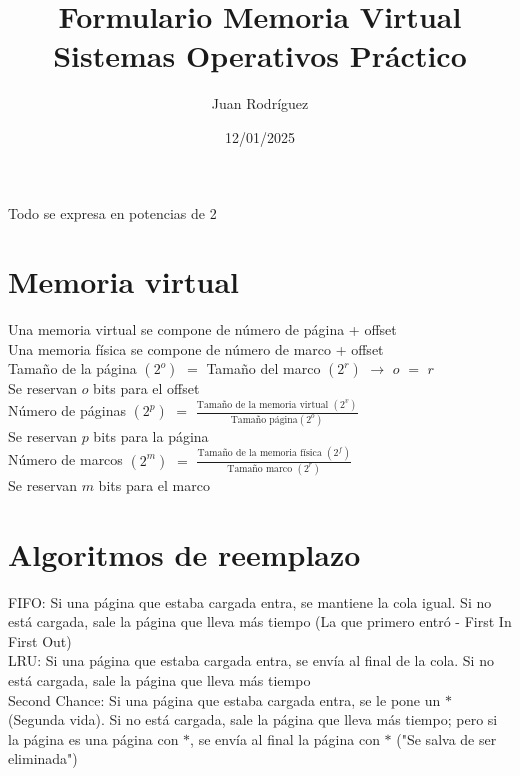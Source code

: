 \documentclass[fleqn]{article}
\author{Juan Rodríguez}
\title{Formulario Memoria Virtual Sistemas Operativos Práctico}
\date{12/01/2025}
\begin{document}
	\maketitle
	Todo se expresa en potencias de 2
	\section{Memoria virtual}
	Una memoria virtual se compone de número de página + offset \\
	
	Una memoria física se compone de número de marco + offset \\
	
	Tamaño de la página $(2^{o})$ $=$ Tamaño del marco $(2^{r})$ $\rightarrow$ $o$ $=$ $r$ \\
	
	Se reservan $o$ bits para el offset \\
	
	Número de páginas $(2^{p})$ $=$ $\frac{\text{Tamaño de la memoria virtual $(2^v)$}}{\text{Tamaño página$(2^{o})$}}$ \\
	
	Se reservan $p$ bits para la página \\
	
	Número de marcos $(2^{m})$ $=$ $\frac{\text{Tamaño de la memoria física $(2^f)$}}{\text{Tamaño marco $(2^{r})$}}$ \\
	
	Se reservan $m$ bits para el marco
	\section{Algoritmos de reemplazo}
	FIFO: Si una página que estaba cargada entra, se mantiene la cola igual. Si no está cargada, sale la página que lleva más tiempo (La que primero entró - First In First Out) \\
	
	LRU: Si una página que estaba cargada entra, se envía al final de la cola. Si no está cargada, sale la página que lleva más tiempo \\
	
	Second Chance: Si una página que estaba cargada entra, se le pone un $*$ (Segunda vida). Si no está cargada, sale la página que lleva más tiempo; pero si la página es una página con $*$, se envía al final la página con $*$ ("Se salva de ser eliminada")
\end{document}
